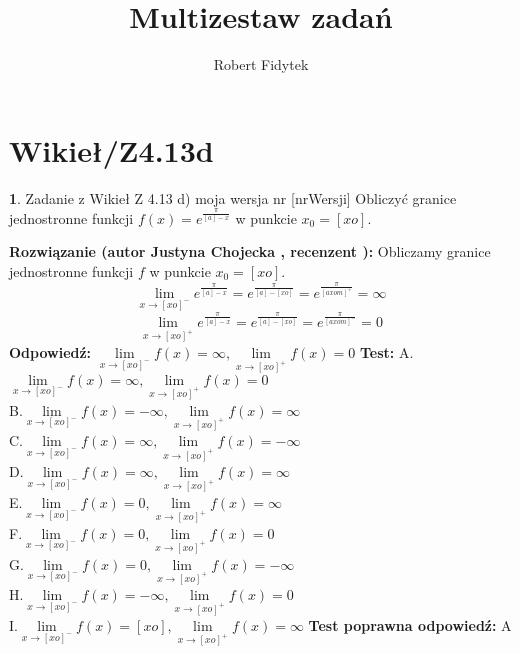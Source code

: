 \documentclass[12pt, a4paper]{article}
\title{Multizestaw zadań}
\author{Robert Fidytek}
\date{}
\theoremstyle{definition} %
\newtheorem{zad}{}
\newcommand{\kategoria}[1]{\section{#1}} %
\newcommand{\zadStart}[1]{\begin{zad}#1\newline} %
\newcommand{\zadStop}{\end{zad}}   %
\newcommand{\rozwStart}[2]{\noindent \textbf{Rozwiązanie (autor #1 , recenzent #2): }\newline} %
\newcommand{\rozwStop}{\newline}                                            %
\newcommand{\odpStart}{\noindent \textbf{Odpowiedź:}\newline}    %
\newcommand{\odpStop}{\newline}                                             %
\newcommand{\testStart}{\noindent \textbf{Test:}\newline} %
\newcommand{\testStop}{\newline} %
\newcommand{\kluczStart}{\noindent \textbf{Test poprawna odpowiedź:}\newline} %
\newcommand{\kluczStop}{\newline} %
\begin{document}
\maketitle


\kategoria{Wikieł/Z4.13d}
\zadStart{Zadanie z Wikieł Z 4.13 d) moja wersja nr [nrWersji]}
Obliczyć granice jednostronne funkcji $f(x)=e^{\frac{\pi}{[a]-x}}$ w punkcie $x_{0}=[xo]$. 
\zadStop
\rozwStart{Justyna Chojecka}{}
Obliczamy granice jednostronne funkcji $f$ w punkcie $x_{0}=[xo]$.
$$\lim\limits_{x\to [xo]^{-}}e^{\frac{\pi}{[a]-x}}=e^{\frac{\pi}{[a]-[xo]}}=e^{\frac{\pi}{[axom]^{+}}}=\infty$$
$$\lim\limits_{x\to [xo]^{+}}e^{\frac{\pi}{[a]-x}}=e^{\frac{\pi}{[a]-[xo]}}=e^{\frac{\pi}{[axom]^{-}}}=0$$
\rozwStop
\odpStart
$\lim\limits_{x\to [xo]^{-}}f(x)=\infty, \lim\limits_{x\to [xo]^{+}}f(x)=0$
\odpStop
\testStart
A.$\lim\limits_{x\to [xo]^{-}}f(x)=\infty, \lim\limits_{x\to [xo]^{+}}f(x)=0$\\
B.$\lim\limits_{x\to [xo]^{-}}f(x)=-\infty, \lim\limits_{x\to [xo]^{+}}f(x)=\infty$\\
C.$\lim\limits_{x\to [xo]^{-}}f(x)=\infty, \lim\limits_{x\to [xo]^{+}}f(x)=-\infty$\\
D.$\lim\limits_{x\to [xo]^{-}}f(x)=\infty, \lim\limits_{x\to [xo]^{+}}f(x)=\infty$\\
E.$\lim\limits_{x\to [xo]^{-}}f(x)=0, \lim\limits_{x\to [xo]^{+}}f(x)=\infty$\\
F.$\lim\limits_{x\to [xo]^{-}}f(x)=0, \lim\limits_{x\to [xo]^{+}}f(x)=0$\\
G.$\lim\limits_{x\to [xo]^{-}}f(x)=0, \lim\limits_{x\to [xo]^{+}}f(x)=-\infty$\\
H.$\lim\limits_{x\to [xo]^{-}}f(x)=-\infty, \lim\limits_{x\to [xo]^{+}}f(x)=0$\\
I.$\lim\limits_{x\to [xo]^{-}}f(x)=[xo], \lim\limits_{x\to [xo]^{+}}f(x)=\infty$
\testStop
\kluczStart
A
\kluczStop
\end{document}
